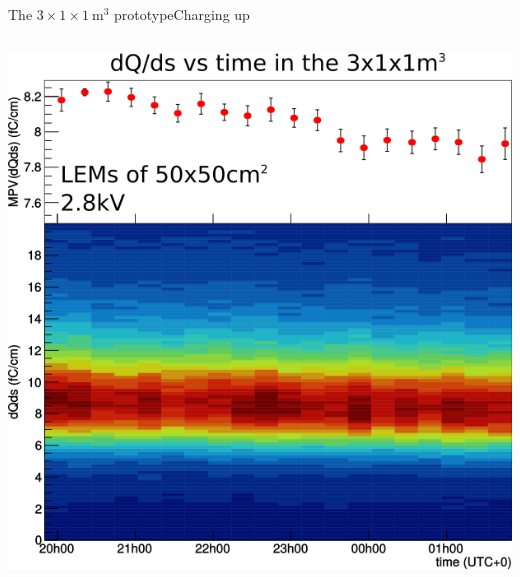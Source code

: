 \documentclass[10pt]{beamer}
\begin{document}
\begin{frame}{The \texorpdfstring{$3 \times 1 \times \SI{1}{\meter\cubed}$}{311} prototype}{Charging up}
\begin{scriptsize}
\begin{columns}
\begin{column}{0.55\textwidth}
    				\centering \includegraphics[width=\textwidth]{figures/311/311_charging_up.png}\\
    				\vfill
    			\end{column}
    		\end{columns}
    	\end{scriptsize}
    \end{frame}
    
\end{document}
